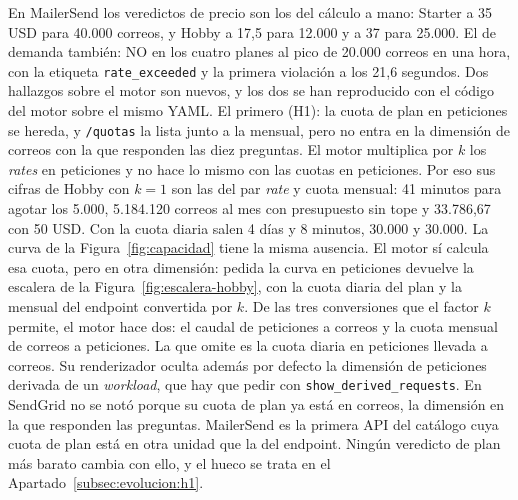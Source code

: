 En MailerSend los veredictos de precio son los del cálculo a mano: Starter a 35 USD para 40.000 correos, y Hobby a 17,5 para 12.000 y a 37 para 25.000.
El de demanda también: NO en los cuatro planes al pico de 20.000 correos en una hora, con la etiqueta \texttt{rate\_exceeded} y la primera violación a los 21,6 segundos.
Dos hallazgos sobre el motor son nuevos, y los dos se han reproducido con el código del motor sobre el mismo YAML.
El primero (H1): la cuota de plan en peticiones se hereda, y \texttt{/quotas} la lista junto a la mensual, pero no entra en la dimensión de correos con la que responden las diez preguntas.
El motor multiplica por $k$ los \textit{rates} en peticiones y no hace lo mismo con las cuotas en peticiones.
Por eso sus cifras de Hobby con $k = 1$ son las del par \textit{rate} y cuota mensual: 41 minutos para agotar los 5.000, 5.184.120 correos al mes con presupuesto sin tope y 33.786,67 con 50 USD.
Con la cuota diaria salen 4 días y 8 minutos, 30.000 y 30.000.
La curva de la Figura~\ref{fig:capacidad} tiene la misma ausencia.
El motor sí calcula esa cuota, pero en otra dimensión: pedida la curva en peticiones devuelve la escalera de la Figura~\ref{fig:escalera-hobby}, con la cuota diaria del plan y la mensual del endpoint convertida por $k$.
De las tres conversiones que el factor $k$ permite, el motor hace dos: el caudal de peticiones a correos y la cuota mensual de correos a peticiones.
La que omite es la cuota diaria en peticiones llevada a correos.
Su renderizador oculta además por defecto la dimensión de peticiones derivada de un \textit{workload}, que hay que pedir con \texttt{show\_derived\_requests}.
En SendGrid no se notó porque su cuota de plan ya está en correos, la dimensión en la que responden las preguntas.
MailerSend es la primera API del catálogo cuya cuota de plan está en otra unidad que la del endpoint.
Ningún veredicto de plan más barato cambia con ello, y el hueco se trata en el Apartado~\ref{subsec:evolucion:h1}.

